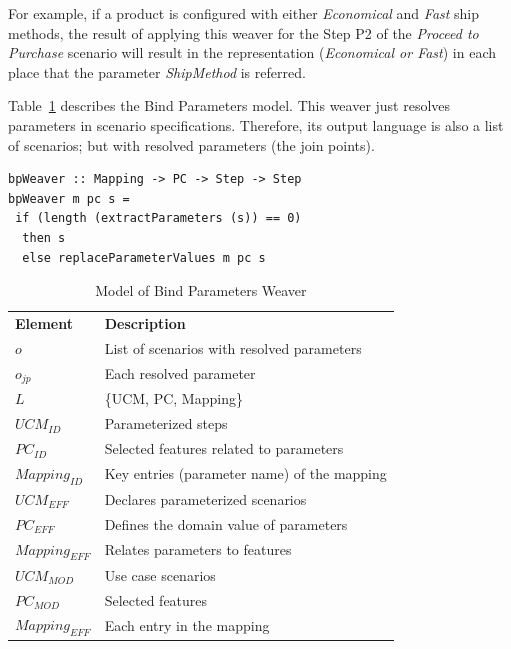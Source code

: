 \documentclass{acm_proc_article-sp}
\begin{document}
For example, if a product is configured with either \emph{Economical} and 
\emph{Fast} ship methods, the result of applying this weaver for 
the Step P2 of the \emph{Proceed to Purchase} scenario will result in the 
representation (\emph{Economical or Fast}) in each place that the parameter \emph{ShipMethod} is referred.

Table~\ref{tab:bp-weaver} describes the Bind Parameters model. This weaver just resolves parameters in scenario specifications. Therefore, its output language is also a list of scenarios; but with resolved parameters (the join points). 

\begin{lstlisting}[belowskip=10pt,frame=tb,caption={Bind parameter weaver function},label=lst:bind]
bpWeaver :: Mapping -> PC -> Step -> Step
bpWeaver m pc s =
 if (length (extractParameters (s)) == 0)
  then s
  else replaceParameterValues m pc s
\end{lstlisting}


\begin{table}[th]
\begin{center}
\caption{Model of Bind Parameters Weaver} \label{tab:bp-weaver}
\begin{tabular}{p{0.7in}p{2.3in}}
   \hline\noalign{\smallskip}
  {\bf Element} & {\bf Description} \\
   \noalign{\smallskip}
   \hline
   \noalign{\smallskip}
   $o$               & List of scenarios with resolved parameters  \\ 
   $o_{jp}$        & Each resolved parameter \\ 
   $L$               & \{UCM, PC, Mapping\} \\ 
   $UCM_{ID}$ & Parameterized steps \\
   $PC_{ID}$    & Selected features related to parameters \\ 
   $Mapping_{ID}$ & Key entries (parameter name) of the mapping\\
   $UCM_{EFF}$ & Declares parameterized scenarios \\
   $PC_{EFF}$    & Defines the domain value of parameters \\ 
   $Mapping_{EFF}$ & Relates parameters to features \\
   $UCM_{MOD}$ & Use case scenarios \\
   $PC_{MOD}$    & Selected features \\ 
   $Mapping_{EFF}$ & Each entry in the mapping \\
  \hline
  \end{tabular}
\end{center}
\end{table}
\end{document}
